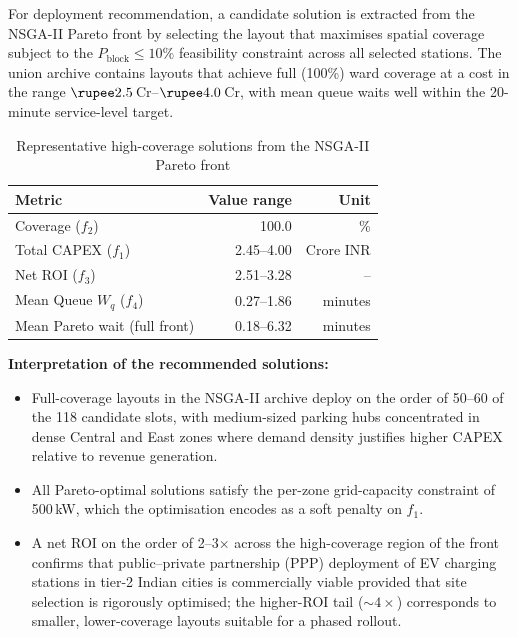 For deployment recommendation, a candidate solution is extracted
from the NSGA-II Pareto front by selecting the layout that
maximises spatial coverage subject to the $P_{\text{block}} \le
10\%$ feasibility constraint across all selected stations. The
union archive contains layouts that achieve full
(100\%) ward coverage at a cost in the range
$\text{\rupee}2.5$\,Cr--$\text{\rupee}4.0$\,Cr, with mean queue
waits well within the 20-minute service-level target.

\begin{table}[H]
\centering
\caption{Representative high-coverage solutions from the NSGA-II
         Pareto front}
\label{tab:optimal}
\begin{tabular}{lrr}
\toprule
Metric & Value range & Unit \\
\midrule
Coverage ($f_2$)              & 100.0      & \%        \\
Total CAPEX ($f_1$)            & 2.45--4.00 & Crore INR \\
Net ROI ($f_3$)                & 2.51--3.28 & --        \\
Mean Queue $W_q$ ($f_4$)        & 0.27--1.86 & minutes   \\
Mean Pareto wait (full front)   & 0.18--6.32 & minutes   \\
\bottomrule
\end{tabular}
\end{table}

\textbf{Interpretation of the recommended solutions:}
\begin{itemize}
    \item Full-coverage layouts in the NSGA-II archive deploy on
          the order of 50--60 of the 118 candidate slots, with
          medium-sized parking hubs concentrated in dense Central
          and East zones where demand density justifies higher
          CAPEX relative to revenue generation.
    \item All Pareto-optimal solutions satisfy the per-zone
          grid-capacity constraint of 500\,kW, which the
          optimisation encodes as a soft penalty on $f_1$.
    \item A net ROI on the order of 2--3$\times$ across the
          high-coverage region of the front confirms that
          public--private partnership (PPP) deployment of EV
          charging stations in tier-2 Indian cities is
          commercially viable provided that site selection is
          rigorously optimised; the higher-ROI tail
          ($\sim 4\times$) corresponds to smaller, lower-coverage
          layouts suitable for a phased rollout.
\end{itemize}

